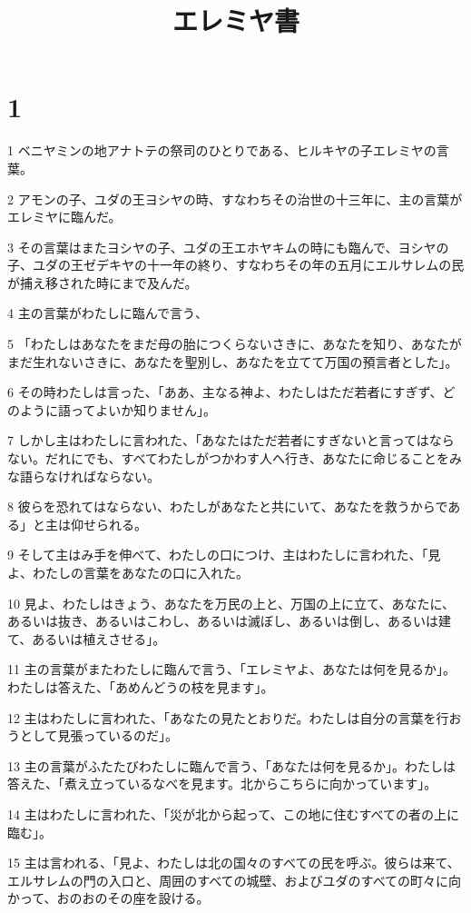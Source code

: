 

\title{エレミヤ書}


\chapter{1}

\par 1 ベニヤミンの地アナトテの祭司のひとりである、ヒルキヤの子エレミヤの言葉。
\par 2 アモンの子、ユダの王ヨシヤの時、すなわちその治世の十三年に、主の言葉がエレミヤに臨んだ。
\par 3 その言葉はまたヨシヤの子、ユダの王エホヤキムの時にも臨んで、ヨシヤの子、ユダの王ゼデキヤの十一年の終り、すなわちその年の五月にエルサレムの民が捕え移された時にまで及んだ。
\par 4 主の言葉がわたしに臨んで言う、
\par 5 「わたしはあなたをまだ母の胎につくらないさきに、あなたを知り、あなたがまだ生れないさきに、あなたを聖別し、あなたを立てて万国の預言者とした」。
\par 6 その時わたしは言った、「ああ、主なる神よ、わたしはただ若者にすぎず、どのように語ってよいか知りません」。
\par 7 しかし主はわたしに言われた、「あなたはただ若者にすぎないと言ってはならない。だれにでも、すべてわたしがつかわす人へ行き、あなたに命じることをみな語らなければならない。
\par 8 彼らを恐れてはならない、わたしがあなたと共にいて、あなたを救うからである」と主は仰せられる。
\par 9 そして主はみ手を伸べて、わたしの口につけ、主はわたしに言われた、「見よ、わたしの言葉をあなたの口に入れた。
\par 10 見よ、わたしはきょう、あなたを万民の上と、万国の上に立て、あなたに、あるいは抜き、あるいはこわし、あるいは滅ぼし、あるいは倒し、あるいは建て、あるいは植えさせる」。
\par 11 主の言葉がまたわたしに臨んで言う、「エレミヤよ、あなたは何を見るか」。わたしは答えた、「あめんどうの枝を見ます」。
\par 12 主はわたしに言われた、「あなたの見たとおりだ。わたしは自分の言葉を行おうとして見張っているのだ」。
\par 13 主の言葉がふたたびわたしに臨んで言う、「あなたは何を見るか」。わたしは答えた、「煮え立っているなべを見ます。北からこちらに向かっています」。
\par 14 主はわたしに言われた、「災が北から起って、この地に住むすべての者の上に臨む」。
\par 15 主は言われる、「見よ、わたしは北の国々のすべての民を呼ぶ。彼らは来て、エルサレムの門の入口と、周囲のすべての城壁、およびユダのすべての町々に向かって、おのおのその座を設ける。
